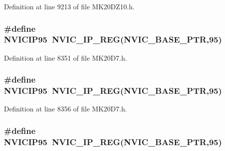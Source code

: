 Definition at line 9213 of file M\+K20\+D\+Z10.\+h.

\subsubsection[{\texorpdfstring{N\+V\+I\+C\+I\+P95}{NVICIP95}}]{\setlength{\rightskip}{0pt plus 5cm}\#define N\+V\+I\+C\+I\+P95~{\bf N\+V\+I\+C\+\_\+\+I\+P\+\_\+\+R\+EG}({\bf N\+V\+I\+C\+\_\+\+B\+A\+S\+E\+\_\+\+P\+TR},95)}\hypertarget{group___n_v_i_c___register___accessor___macros_ga2b00e3c1ae823833b541f4ab045dddd9}{}\label{group___n_v_i_c___register___accessor___macros_ga2b00e3c1ae823833b541f4ab045dddd9}


Definition at line 8351 of file M\+K20\+D7.\+h.

\subsubsection[{\texorpdfstring{N\+V\+I\+C\+I\+P95}{NVICIP95}}]{\setlength{\rightskip}{0pt plus 5cm}\#define N\+V\+I\+C\+I\+P95~{\bf N\+V\+I\+C\+\_\+\+I\+P\+\_\+\+R\+EG}({\bf N\+V\+I\+C\+\_\+\+B\+A\+S\+E\+\_\+\+P\+TR},95)}\hypertarget{group___n_v_i_c___register___accessor___macros_ga2b00e3c1ae823833b541f4ab045dddd9}{}\label{group___n_v_i_c___register___accessor___macros_ga2b00e3c1ae823833b541f4ab045dddd9}


Definition at line 8356 of file M\+K20\+D7.\+h.

\subsubsection[{\texorpdfstring{N\+V\+I\+C\+I\+P95}{NVICIP95}}]{\setlength{\rightskip}{0pt plus 5cm}\#define N\+V\+I\+C\+I\+P95~{\bf N\+V\+I\+C\+\_\+\+I\+P\+\_\+\+R\+EG}({\bf N\+V\+I\+C\+\_\+\+B\+A\+S\+E\+\_\+\+P\+TR},95)}\hypertarget{group___n_v_i_c___register___accessor___macros_ga2b00e3c1ae823833b541f4ab045dddd9}{}\label{group___n_v_i_c___register___accessor___macros_ga2b00e3c1ae823833b541f4ab045dddd9}


